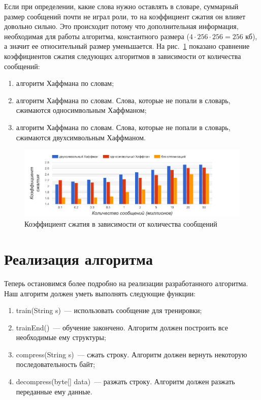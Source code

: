 Если при определении, какие слова нужно оставлять в словаре, суммарный размер сообщений почти не играл роли, то на коэффициент сжатия 
он влияет довольно сильно. Это происходит потому что дополнительная информация, необходимая для работы алгоритма, константного размера ($4 \cdot 256 \cdot 256 = 256 \text{ кб}$),
а значит ее относительный размер уменьшается. На рис.~\ref{fig7} показано сравнение коэффициентов сжатия следующих алгоритмов
в зависимости от количества сообщений:
\begin{enumerate}
	\item алгоритм Хаффмана по словам;
	\item алгоритм Хаффмана по словам. Слова, которые не попали в словарь, сжимаются односимвольным Хаффманом;
	\item алгоритм Хаффмана по словам. Слова, которые не попали в словарь, сжимаются двухсимвольным Хаффманом.
\end{enumerate}

\begin{figure}[h!]
  \includegraphics[width=\linewidth]{pics/compare.png}
  \caption{Коэффициент сжатия в зависимости от количества сообщений}
  \label{fig7}
\end{figure}

\section{Реализация алгоритма}

Теперь остановимся более подробно на реализации разработанного алгоритма. Наш алгоритм должен уметь выполнять следующие функции:
\begin{enumerate}
	\item train(String s)~--- использовать сообщение для тренировки;
	\item trainEnd()~--- обучение закончено. Алгоритм должен построить все необходимые ему структуры;
	\item compress(String s)~--- сжать строку. Алгоритм должен вернуть некоторую последовательность байт;
	\item decompress(byte[] data)~--- разжать строку. Алгоритм должен разжать переданные ему данные.
\end{enumerate}

